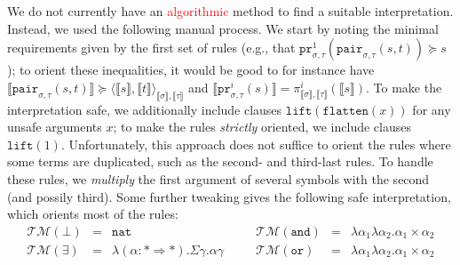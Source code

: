 \documentclass[a4paper,UKenglish,cleveref,autoref,numberwithinsect]{lipics-v2019}
\theoremstyle{definition}
\newcommand{\arrkind}{\Rightarrow}
\newcommand{\pair}[2]{\langle #1,#2 \rangle}
\newcommand{\nat}{\mathtt{nat}}
\newcommand{\flatten}{\mathtt{flatten}}
\newcommand{\lift}{\mathtt{lift}}
\newcommand{\typeinterpret}[1]{\llbracket #1 \rrbracket}
\newcommand{\interpret}[1]{\llbracket #1 \rrbracket}
\newcommand{\Typemap}{\mathcal{T\!M}}
\newcommand{\Termmap}{\mathcal{J}}
\newcommand{\succinterpret}{\succ^{\Termmap}}
\newcommand{\proj}{\mathtt{pr}}
\newcommand{\LCchange}[1]{\textcolor{red}{#1}}
\begin{document}
We do not currently have an \LCchange{algorithmic} method to find a
suitable interpretation.  Instead, we used the following manual process.
We start by noting the minimal requirements given by the first set of
rules (e.g., that $\proj^1_{\sigma,\tau}(\mathtt{pair}_{\sigma,\tau}(s,
t)) \succeq s$); to orient these inequalities, it would be good to for
instance have $\interpret{\mathtt{pair}_{\sigma,\tau}(s,t)} \succeq
\pair{\interpret{s}}{\interpret{t}}_{\typeinterpret{\sigma},
\typeinterpret{\tau}}$ and $\interpret{\proj^i_{\sigma,\tau}(s)} =
\pi^i_{\typeinterpret{\sigma},\typeinterpret{\tau}}(\interpret{s})$.
To make the interpretation safe, we additionally include clauses
$\lift(\flatten(x))$ for any unsafe arguments $x$; to make the rules
\emph{strictly} oriented, we include clauses $\lift(1)$.  %
Unfortunately, this approach does not suffice to orient the rules
where some terms are duplicated, such as the second- and third-last
rules.  To handle these rules, we \emph{multiply} the first argument
of several symbols with the second (and possily third).  Some further
tweaking gives the following safe interpretation, which orients most
of the rules:
\[
\begin{array}{rclcrcl}
\Typemap(\bot) & = & \nat
& \quad &
\Typemap(\mathtt{and}) & = & \lambda\alpha_1\lambda\alpha_2 . \alpha_1\times\alpha_2 \\

\Typemap(\exists) & = & \lambda(\alpha : * \arrkind *) . \Sigma \gamma . \alpha \gamma
& \quad &
\Typemap(\mathtt{or}) & = & \lambda\alpha_1\lambda\alpha_2 . \alpha_1\times\alpha_2 \\
\end{array}
\]
\end{document}

